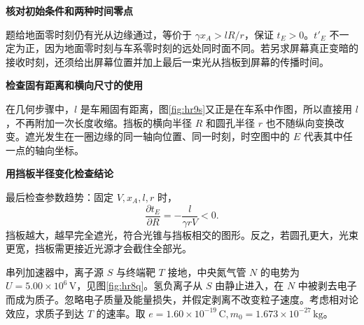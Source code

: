 \begin{solution}
\par\medskip{}\noindent\textbf{核对初始条件和两种时间零点}\par\nobreak
题给地面零时刻仍有光从边缘通过，等价于 $\gamma x_A>lR/r$，保证 $t_E>0$。$t'_E$ 不一定为正，因为地面零时刻与车系零时刻的远处同时面不同。若另求屏幕真正变暗的接收时刻，还须给出屏幕位置并加上最后一束光从挡板到屏幕的传播时间。



\par\medskip{}\noindent\textbf{检查固有距离和横向尺寸的使用}\par\nobreak
在几何步骤中，$l$ 是车厢固有距离，图\ref{fig:hr9s}又正是在车系中作图，所以直接用 $l$，不再附加一次长度收缩。挡板的横向半径 $R$ 和圆孔半径 $r$ 也不随纵向变换改变。遮光发生在一圈边缘的同一轴向位置、同一时刻，时空图中的 $E$ 代表其中任一点的轴向坐标。



\par\medskip{}\noindent\textbf{用挡板半径变化检查结论}\par\nobreak
最后检查参数趋势：固定 $V,x_A,l,r$ 时，
\[
\frac{\partial t_E}{\partial R}=-\frac{l}{\gamma rV}<0.
\]
挡板越大，越早完全遮光，符合光锥与挡板相交的图形。反之，若圆孔更大，光束更宽，挡板需更接近光源才会截住全部光。
\end{solution}

\begin{question}
\begin{example}[串列静电加速器]\label{ex:hr8}
串列加速器中，离子源 $S$ 与终端靶 $T$ 接地，中央氮气管 $N$ 的电势为 $U=5.00\times10^6\,\mathrm V$，见图\ref{fig:hr8q}。氢负离子从 $S$ 由静止进入，在 $N$ 中被剥去电子而成为质子。忽略电子质量及能量损失，并假定剥离不改变粒子速度。考虑相对论效应，求质子到达 $T$ 的速率。取 $e=1.60\times10^{-19}\,\mathrm C,m_0=1.673\times10^{-27}\,\mathrm{kg}$。
\end{example}
\end{question}

